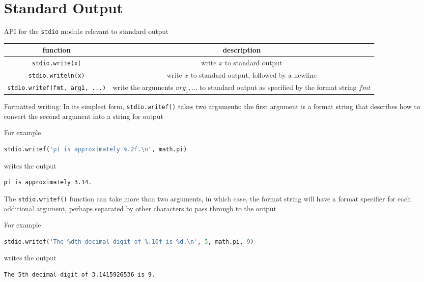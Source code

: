 \documentclass[8pt,a4paper,compress]{beamer}
\begin{document}
\section{Standard Output}
\begin{frame}[fragile]
\pause

API for the \lstinline{stdio} module relevant to standard output
\begin{center}
\begin{tabular}{cc}
function & description \\ \hline
\lstinline$stdio.write(x)$ & write $x$ to standard output \\
\lstinline$stdio.writeln(x)$ & write $x$ to standard output, followed by a newline \\
\lstinline$stdio.writef(fmt, arg1, ...)$ & \makecell{write the arguments $arg_1, \dots$ to standard output \\ as specified by the format string $fmt$} \\
\end{tabular} 
\end{center}

\pause\bigskip

Formatted writing: In its simplest form, \lstinline{stdio.writef()} takes two arguments; the first argument is a format string that describes how to convert the second argument into a string for output

\pause\bigskip

For example
\begin{lstlisting}[language=Python,style=focusin]
stdio.writef('pi is approximately %.2f.\n', math.pi)
\end{lstlisting}

\smallskip

writes the output

\smallskip

\begin{lstlisting}[language={},style=focusin]
pi is approximately 3.14.
\end{lstlisting}

\pause\bigskip

The \lstinline{stdio.writef()} function can take more than two arguments, in which case, the format string will have a format specifier for each additional argument, perhaps separated by other characters to pass through to the output

\pause\bigskip

For example

\smallskip

\begin{lstlisting}[language=Python,style=focusin]
stdio.writef('The %dth decimal digit of %.10f is %d.\n', 5, math.pi, 9)
\end{lstlisting}

\smallskip

writes the output

\smallskip

\begin{lstlisting}[language={},style=focusin]
The 5th decimal digit of 3.1415926536 is 9.
\end{lstlisting}
\end{frame}
\end{document}
